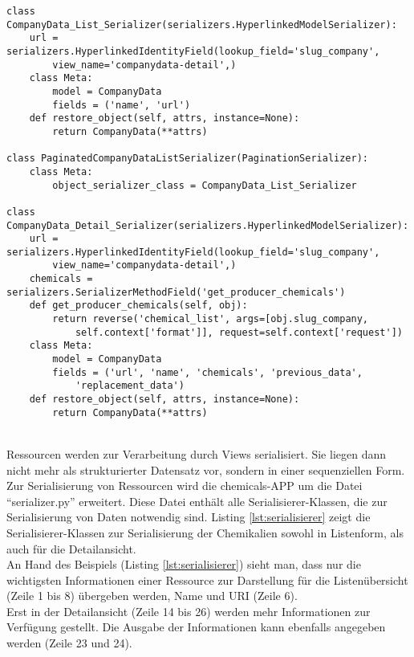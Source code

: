 \begin{lstlisting}[caption={Serialisierer-Klassen zur Serialisierung von
Chemikalien. Sowohl für die Detailansicht, als auch für die Listenansicht
(Ressource: Producer)
}, label=lst:serialisierer, captionpos=b] 
class CompanyData_List_Serializer(serializers.HyperlinkedModelSerializer):
    url = serializers.HyperlinkedIdentityField(lookup_field='slug_company',
        view_name='companydata-detail',)
    class Meta:
        model = CompanyData
        fields = ('name', 'url')
    def restore_object(self, attrs, instance=None):
        return CompanyData(**attrs)

class PaginatedCompanyDataListSerializer(PaginationSerializer):
    class Meta:
        object_serializer_class = CompanyData_List_Serializer

class CompanyData_Detail_Serializer(serializers.HyperlinkedModelSerializer):
    url = serializers.HyperlinkedIdentityField(lookup_field='slug_company',
        view_name='companydata-detail',)
    chemicals = serializers.SerializerMethodField('get_producer_chemicals')
    def get_producer_chemicals(self, obj):
        return reverse('chemical_list', args=[obj.slug_company, 
            self.context['format']], request=self.context['request'])
    class Meta:
        model = CompanyData
        fields = ('url', 'name', 'chemicals', 'previous_data', 
            'replacement_data')
    def restore_object(self, attrs, instance=None):
        return CompanyData(**attrs)
\end{lstlisting}
\\
Ressourcen werden zur Verarbeitung durch Views serialisiert.
Sie liegen dann nicht mehr als strukturierter Datensatz vor, sondern in einer
sequenziellen Form.
\\
Zur Serialisierung von Ressourcen wird die chemicals-\ac{APP} um
die Datei "`serializer.py"' erweitert. Diese Datei enthält alle
Serialisierer-Klassen, die zur Serialisierung von Daten notwendig sind.
Listing \ref{lst:serialisierer} zeigt die Serialisierer-Klassen zur
Serialisierung der Chemikalien sowohl in Listenform, als auch für die
Detailansicht.
\\
An Hand des Beispiels (Listing \ref{lst:serialisierer}) sieht man, dass nur die
wichtigsten Informationen einer Ressource zur Darstellung für die
Listenübersicht (Zeile 1 bis 8) übergeben werden, Name und \ac{URI} (Zeile 6).
\\
Erst in der Detailansicht (Zeile 14 bis 26) werden mehr Informationen zur
Verfügung gestellt. Die Ausgabe der Informationen kann ebenfalls
angegeben werden (Zeile 23 und 24).
\\

